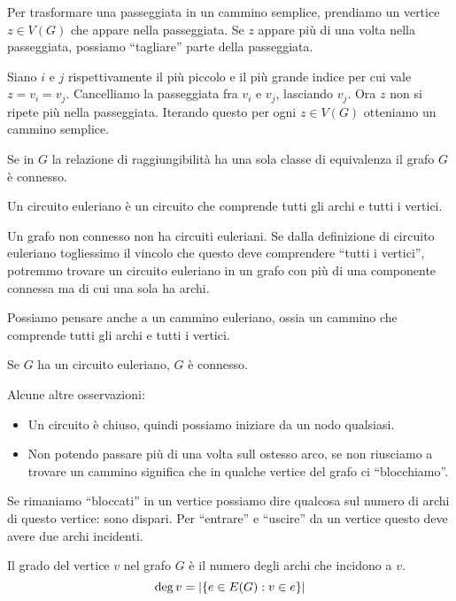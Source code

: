 Per trasformare una passeggiata in un cammino semplice, prendiamo un vertice $z \in V(G)$ che appare nella passeggiata.
Se $z$ appare pi\`u di una volta nella passeggiata, possiamo ``tagliare'' parte della passeggiata.

Siano $i$ e $j$ rispettivamente il pi\`u piccolo e il pi\`u grande indice per cui vale $z = v_i = v_j$.
Cancelliamo la passeggiata fra $v_i$ e $v_j$, lasciando $v_j$.
Ora $z$ non si ripete pi\`u nella passeggiata.
Iterando questo per ogni $z \in V(G)$ otteniamo un cammino semplice.

\begin{defn}
	Se in $G$ la relazione di raggiungibilit\`a ha una sola classe di equivalenza il grafo $G$ \`e connesso.
\end{defn}

\begin{defn}
	Un circuito euleriano \`e un circuito che comprende tutti gli archi e tutti i vertici.
\end{defn}
Un grafo non connesso non ha circuiti euleriani.
Se dalla definizione di circuito euleriano togliessimo il vincolo che questo deve comprendere ``tutti i vertici'', potremmo trovare un circuito euleriano in un grafo con pi\`u di una componente connessa ma di cui una sola ha archi.

Possiamo pensare anche a un cammino euleriano, ossia un cammino che comprende tutti gli archi e tutti i vertici.
\begin{oss}
	Se $G$ ha un circuito euleriano, $G$ \`e connesso.
\end{oss}
Alcune altre osservazioni:
\begin{itemize}
	\item Un circuito \`e chiuso, quindi possiamo iniziare da un nodo qualsiasi.
	\item Non potendo passare pi\`u di una volta sull ostesso arco, se non riusciamo a trovare un cammino significa che in qualche vertice del grafo ci ``blocchiamo''.
\end{itemize}
Se rimaniamo ``bloccati'' in un vertice possiamo dire qualcosa sul numero di archi di questo vertice: sono dispari.
Per ``entrare'' e ``uscire'' da un vertice questo deve avere due archi incidenti.

\begin{defn}
	Il grado del vertice $v$ nel grafo $G$ \`e il numero degli archi che incidono a $v$.
	\[
		\deg{v} = \left\lvert{\{ e \in E(G) : v \in e \}}\right\rvert
	\]
\end{defn}

